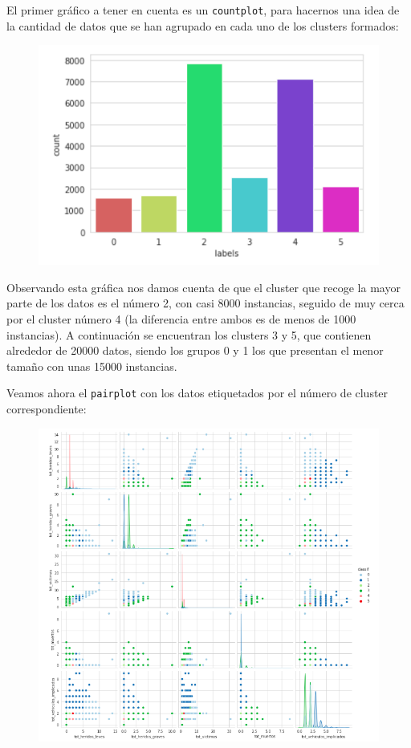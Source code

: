 \documentclass[a4paper,11pt]{book}
\begin{document}
El primer gráfico a tener en cuenta es un \texttt{countplot}, para hacernos una idea de la cantidad de datos que se han agrupado en cada uno de los clusters formados:

\begin{figure}[h]
	\centering
	\includegraphics[width=0.7\linewidth]{img/count3}
	\caption{}
	\label{fig:count3}
\end{figure}

Observando esta gráfica nos damos cuenta de que el cluster que recoge la mayor parte de los datos es el número 2, con casi 8000 instancias, seguido de muy cerca por el cluster número 4 (la diferencia entre ambos es de menos de 1000 instancias). A continuación se encuentran los clusters 3 y 5, que contienen alrededor de 20000 datos, siendo los grupos 0 y 1 los que presentan el menor tamaño con unas 15000 instancias.

Veamos ahora el \texttt{pairplot} con los datos etiquetados por el número de cluster correspondiente:  
\vspace{15cm}

\begin{figure}[h]
	\centering
	\includegraphics[width=1.1\linewidth]{img/pairplot3}
	\caption{}
	\label{fig:pairplot3}
\end{figure}
\end{document}
